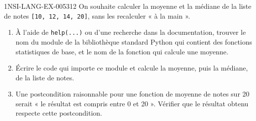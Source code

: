\begin{exercice}{1NSI-LANG-EX-005}{3}{12}
On souhaite calculer la moyenne et la médiane de la liste de notes \lstinline{[10, 12, 14, 20]},
sans les recalculer « à la main ».
\begin{enumerate}
  \item À l'aide de \lstinline{help(...)} ou d'une recherche dans la documentation, trouver le nom du module de la bibliothèque standard Python qui contient des fonctions statistiques de base, et le nom de la fonction qui calcule une moyenne.
  \item Écrire le code qui importe ce module et calcule la moyenne, puis la médiane, de la liste de notes.
  \item Une postcondition raisonnable pour une fonction de moyenne de notes sur 20 serait « le résultat est compris entre 0 et 20 ». Vérifier que le résultat obtenu respecte cette postcondition.
\end{enumerate}
\end{exercice}
